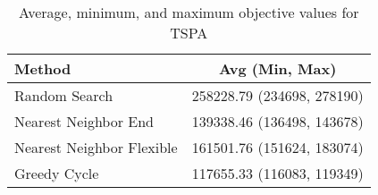 \begin{table}[h!]
\centering
\begin{tabular}{lc}
\hline
Method & Avg (Min, Max) \\
\hline
Random Search & 258228.79 (234698, 278190) \\
Nearest Neighbor End & 139338.46 (136498, 143678) \\
Nearest Neighbor Flexible & 161501.76 (151624, 183074) \\
Greedy Cycle & 117655.33 (116083, 119349) \\
\hline
\end{tabular}
\caption{Average, minimum, and maximum objective values for TSPA}
\label{tab:TSPA_results}
\end{table}
